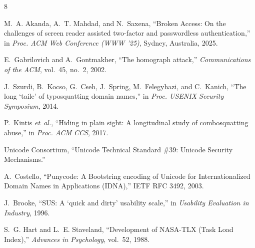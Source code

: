\documentclass[conference]{IEEEtran}
\begin{document}
\begin{thebibliography}{8}

M.~A. Akanda, A.~T. Mahdad, and N.~Saxena, ``Broken Access: On the challenges of screen reader assisted two-factor and passwordless authentication,'' in \emph{Proc. ACM Web Conference (WWW '25)}, Sydney, Australia, 2025.

E.~Gabrilovich and A.~Gontmakher, ``The homograph attack,'' \emph{Communications of the ACM}, vol.~45, no.~2, 2002.

J.~Szurdi, B.~Kocso, G.~Cseh, J.~Spring, M.~Felegyhazi, and C.~Kanich, ``The long `taile' of typosquatting domain names,'' in \emph{Proc. USENIX Security Symposium}, 2014.

P.~Kintis \emph{et~al.}, ``Hiding in plain sight: A longitudinal study of combosquatting abuse,'' in \emph{Proc. ACM CCS}, 2017.

Unicode Consortium, ``Unicode Technical Standard \#39: Unicode Security Mechanisms.''

A.~Costello, ``Punycode: A Bootstring encoding of Unicode for Internationalized Domain Names in Applications (IDNA),'' IETF RFC 3492, 2003.

J.~Brooke, ``SUS: A `quick and dirty' usability scale,'' in \emph{Usability Evaluation in Industry}, 1996.

S.~G. Hart and L.~E. Staveland, ``Development of NASA-TLX (Task Load Index),'' \emph{Advances in Psychology}, vol.~52, 1988.

\end{thebibliography}
\end{document}
